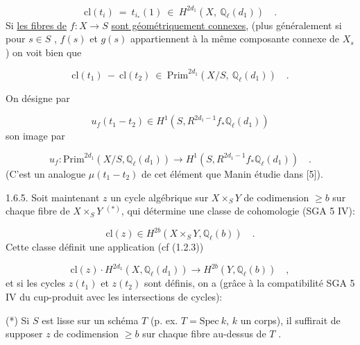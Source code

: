 \begin{equation}\tag{1.6.1}
\mathrm{cl}(t_i) \ = \ t_{i_*}(1) \ \in \ H^{2d_1} (X, \ \mathbb{Q}_\ell(d_1)) \quad .
\end{equation}
Si \underline{les fibres de} $f : X \longrightarrow S$ \underline{sont géométriquement connexes}, (plus généralement si pour $s \in S$ , $f(s)$ et $g(s)$ appartiennent à la même composante connexe de $X_s$ ) on voit bien que

\begin{equation}\tag{1.6.2}
\mathrm{cl}(t_1) \ - \ \mathrm{cl}(t_2) \ \in \ \mathrm{Prim}^{2d_1} (X/S, \ \mathbb{Q}_\ell(d_1)) \quad .
\end{equation}


On désigne par

\begin{equation}\tag{1.6.3}
u_f(t_1-t_2) \in H^1(S, R^{2d_1-1}f_*\mathbb{Q}_\ell(d_1))
\end{equation}
son image par

\begin{equation}\tag{1.6.4}
u_f : \mathrm{Prim}^{2d_1}(X/S, \mathbb{Q}_\ell(d_1)) \longrightarrow H^1(S, R^{2d_1-1}f_*\mathbb{Q}_\ell(d_1)) \quad .
\end{equation}
(C'est un analogue $\mu(t_1 - t_2)$ de cet élément que Manin étudie dans [5]).

1.6.5. Soit maintenant $z$ un cycle algébrique sur $X \times_S Y$ de codimension $\geq b$ sur chaque fibre de $X \times_S Y$ $^{(*)}$, qui détermine une classe de cohomologie (SGA 5 IV\hspace{2em}):

\begin{equation}\tag{1.6.6}
\mathrm{cl}(z) \in H^{2b}(X \times_S Y, \mathbb{Q}_\ell(b)) \quad .
\end{equation}
Cette classe définit une application (cf (1.2.3))

\begin{equation}\tag{1.6.7}
\mathrm{cl}(z) \cdot H^{2d_1}(X, \mathbb{Q}_\ell(d_1)) \longrightarrow H^{2b}(Y, \mathbb{Q}_\ell(b)) \quad ,
\end{equation}
et si les cycles $z(t_1)$ et $z(t_2)$ sont définis, on a (grâce à la compatibilité SGA 5 IV\hspace{3em} du cup-produit avec les intersections de cycles):

(*) Si $S$ est lisse sur un schéma $T$ (p. ex. $T=\mathrm{Spec}\ k$, $k$ un corps), il suffirait de supposer $z$ de codimension $\geq b$ sur chaque fibre au-dessus de $T$ .


